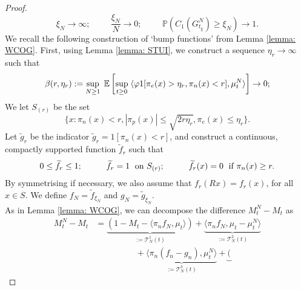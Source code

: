 \documentclass[11pt, notitlepage]{article}
\begin{document}
\begin{proof}
\begin{equation}
       \xi_N\rightarrow \infty; \hspace{1cm} \frac{\xi_N}{N}\rightarrow 0; \hspace{1cm}\mathbb{P}(C_1(G^N_{t_\mathrm{g}})\geq \xi_N)\rightarrow 1.
   \end{equation}  We recall the following construction of `bump functions' from Lemma \ref{lemma: WCOG}. First, using Lemma \ref{lemma: STUI}, we construct a sequence $\eta_r \rightarrow \infty$ such that \begin{equation}\label{eq: choice of etar 1}
    \beta(r, \eta_r):=\sup_{N\geq 1} \hspace{0.1cm} \mathbb{E}\left[\sup_{t\geq 0}\hspace{0.1cm}\langle \varphi 1[\pi_e(x)>\eta_r, \pi_n(x)< r], \mu^N_t\rangle \right]\rightarrow 0;
\end{equation} We let $S_{(r)}$ be the set \begin{equation}
       \{x: \pi_n(x)< r, |\pi_p(x)|\leq \sqrt{2r\eta_r}, \pi_e(x)\leq \eta_r\}.
   \end{equation} Let $\widetilde{g}_r$ be the indicator $\widetilde{g}_r=1[\pi_n(x)< r]$, and construct a continuous, compactly supported function $\widetilde{f}_r$ such that \begin{equation}
      0\leq \widetilde{f}_r\leq 1;\hspace{1cm} \widetilde{f}_r=1 \hspace{0.1cm} \text{ on } S_{(r)};\hspace{1cm} \widetilde{f}_r(x)=0 \hspace{0.1cm} \text{ if } \pi_n(x)\ge r.
   \end{equation} By symmetrising if necessary, we also assume that $f_r(Rx)=f_r(x)$, for all $x\in S$. We define $f_N=\widetilde{f}_{\xi_N}$ and $g_N=\widetilde{g}_{\xi_N}$. \medskip \\ As in Lemma \ref{lemma: WCOG}, we can decompose the difference $M^N_t-M_t$ as \begin{equation}\label{eq: decomposition of erorr}\begin{split} M^N_t-M_t &= \underbrace{(1-M_t-\langle \pi_n f_N, \mu_t\rangle)}_{:=\mathcal{T}^1_N(t)} + \underbrace{\langle \pi_n f_N, \mu_t-\mu^N_t\rangle}_{:=\mathcal{T}^2_N(t)} \\& \hspace{2cm}+ \underbrace{\langle \pi_n (f_n-g_n), \mu^N_t\rangle}_{:=\mathcal{T}^3_N(t)} +\underbrace{(
}
\end{split}
\end{equation}
\end{proof}
\end{document}
